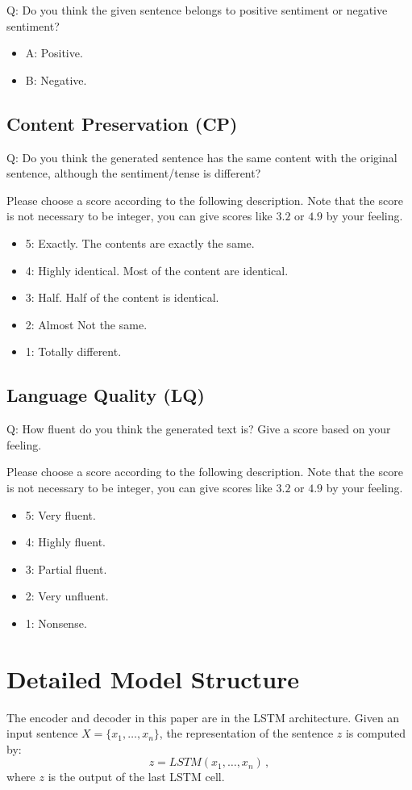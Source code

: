 \documentclass[11pt,a4paper]{article}
\begin{document}
Q: Do you think the given sentence belongs to positive sentiment or negative sentiment?

\begin{itemize}
\item A: Positive. 
\item B: Negative.
\end{itemize}
 

\subsection{Content Preservation (CP)}

Q: Do you think the generated sentence has the same content with the original sentence, although the sentiment/tense is different?

Please choose a score according to the following description. Note that the score is not necessary to be integer, you can give scores like $3.2$ or $4.9$ by your feeling.
\begin{itemize}
\item 5: Exactly. The contents are exactly the same.
\item 4: Highly identical. Most of the content are identical.
\item 3: Half. Half of the content is identical.
\item 2: Almost Not the same.
\item 1: Totally different.
\end{itemize}

\subsection{ Language Quality (LQ)}

Q: How fluent do you think the generated text is? Give a score based on your feeling. 


Please choose a score according to the following description. Note that the score is not necessary to be integer, you can give scores like $3.2$ or $4.9$ by your feeling.
\begin{itemize}
\item 5: Very fluent. 
\item 4: Highly fluent. 
\item 3: Partial fluent. 
\item 2: Very unfluent. 
\item 1: Nonsense.
\end{itemize}

\section{Detailed Model Structure}
The encoder and decoder in this paper are in the LSTM architecture. Given an input sentence $X=\{x_1,\ldots, x_n\}$, the representation of the sentence $z$ is computed by:
\begin{equation}
    z=LSTM(x_1,\ldots, x_n)\,,
\end{equation}
where $z$ is the output of the last LSTM cell. 
\end{document}
